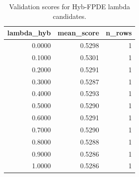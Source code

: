\begin{table}[t]
\caption{Validation scores for Hyb-FPDE lambda candidates.}
\label{tab:lambda_distribution_computed}
\centering
\begin{tabular}{rrr}
\toprule
lambda\_hyb & mean\_score & n\_rows \\
\midrule
0.0000 & 0.5298 & 1 \\
0.1000 & 0.5301 & 1 \\
0.2000 & 0.5291 & 1 \\
0.3000 & 0.5287 & 1 \\
0.4000 & 0.5293 & 1 \\
0.5000 & 0.5290 & 1 \\
0.6000 & 0.5291 & 1 \\
0.7000 & 0.5290 & 1 \\
0.8000 & 0.5288 & 1 \\
0.9000 & 0.5286 & 1 \\
1.0000 & 0.5286 & 1 \\
\bottomrule
\end{tabular}

\end{table}
